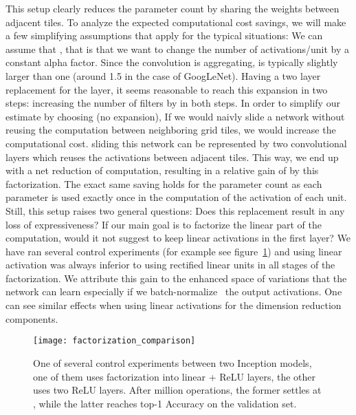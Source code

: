 \documentclass[10pt,twocolumn,letterpaper]{article}
\begin{document}
This setup clearly reduces the parameter count
by sharing the weights between adjacent tiles.
To analyze the expected computational cost savings,
we will make a few simplifying assumptions that apply for the typical
situations: We can assume that , that is that we want to change the
number of activations/unit by a constant alpha factor. Since the 
convolution is aggregating,  is typically slightly larger
than one (around 1.5 in the case of GoogLeNet). Having a two layer replacement
for the  layer, it seems reasonable to reach this expansion in two
steps: increasing the number of filters by  in both steps.
In order to simplify our estimate by choosing  (no expansion),
If we would naivly slide a network without reusing the computation between
neighboring grid tiles, we would increase the computational cost.
sliding this network can be represented by two  convolutional layers
which reuses the activations between adjacent tiles.
This way, we end up with a net  reduction
of computation, resulting in a relative gain of  by this factorization.
The exact same saving holds for the parameter count as each parameter
is used exactly once in the computation of the activation of each unit.
Still, this setup raises two general questions: Does this replacement result in
any loss of expressiveness? If our main goal is to factorize the linear part of
the computation, would it not suggest to keep linear activations in
the first layer? We have ran several control experiments
(for example see figure~\ref{fig:factorization_comparison}) and using
linear activation was always inferior to using rectified linear units in
all stages of the factorization.
We attribute this gain to the enhanced space of variations that the network
can learn especially if we batch-normalize~\cite{ioffe2015batch} the
output activations. One can see similar effects when using linear activations
for the dimension reduction components.
\begin{figure}
\centering
\texttt{[image: factorization\_comparison]}
\caption{One of several control experiments between two Inception models,
  one of them uses factorization into linear + ReLU layers, the other uses
  two ReLU layers. After  million operations, the former settles at
  , while the latter reaches  top-1 Accuracy on the
  validation set.}
\label{fig:factorization_comparison}
\end{figure}
\end{document}
